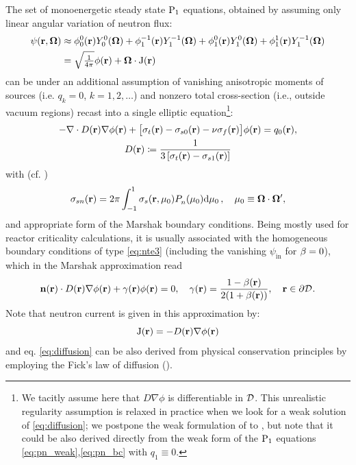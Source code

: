 The set of monoenergetic steady state $\PN[1]$ equations, obtained by assuming only linear angular variation of neutron
flux:
$$
\begin{aligned}
	\psi(\br,\bomega) &\approx \angmom{0}{0}(\br)\Y{0}{0}(\bomega) + \angmom{1}{-1}(\br)\Y{1}{-1}(\bomega)
	+ \angmom{1}{0}(\br)\Y{1}{0}(\bomega) + \angmom{1}{1}(\br)\Y{1}{-1}(\bomega)\\
	&= \sqrt{\tfrac{1}{4\pi}}\phi(\br) + \bomega\cdot \bJ(\br)
\end{aligned}
$$
can be under an additional assumption of vanishing %
anisotropic moments of sources (i.e. $q_{k} = 0$, $k = 1,2,\ldots$) and nonzero total cross-section (i.e., outside
vacuum regions) recast into a single elliptic equation\footnote{We tacitly assume here that $D\nabla\phi$ is
differentiable in $\VV$.
This unrealistic regularity assumption is relaxed in practice when we look for a weak solution of
\eqref{eq:diffusion}; we postpone the weak formulation of  to
, but note that it could be also derived directly from the weak form of the $\PN[1]$ equations
\eqref{eq:pn_weak},\eqref{eq:pn_bc} with $q_1 \equiv 0$.}:
\begin{equation}\label{eq:diffusion}
\begin{gathered}
	-\nabla\cdot D(\br) \nabla\phi(\br) + \bigl[\sigma_t(\br) - \sigma_{s0}(\br)  - \nu\sigma_f(\br) \bigr]\phi(\br) =
	q_0(\br),\\
	D(\br) \coloneqq \frac{1}{3\left[\sigma_t(\br) - \sigma_{s1}(\br)\right]}
\end{gathered}
\end{equation}
with (cf. )
\begin{equation}\label{eq:diffusion_ss}
	\sigma_{sn}(\br) = 2\pi \muint[_0]{\sigma_s(\br,\mu_0)\P{n}{}(\mu_0)},\quad \mu_0 \equiv \bomega\cdot\bomega',
\end{equation}
and appropriate form of the Marshak boundary conditions. Being mostly used for reactor criticality calculations, it is
usually associated with the homogeneous boundary conditions of type \eqref{eq:nte3} (including the vanishing
$\psi_{\text{in}}$ for $\albedo = 0$), which in the Marshak approximation read
\begin{equation}\label{eq:diffusion_bc}
	\bn(\br)\cdot D(\br) \nabla\phi(\br) + \gamma(\br)\phi(\br) = 0, \quad \gamma(\br) =
	\frac{1-\albedo(\br)}{2(1+\albedo(\br))},\quad \br\in\pV.
\end{equation}
Note that neutron current is given in this approximation by:
$$
	\bJ(\br) = -D(\br)\nabla\phi(\br)
$$
and eq. \eqref{eq:diffusion} can be also derived from physical conservation principles by employing the Fick's law of
diffusion (\cite{Stacey1}).

